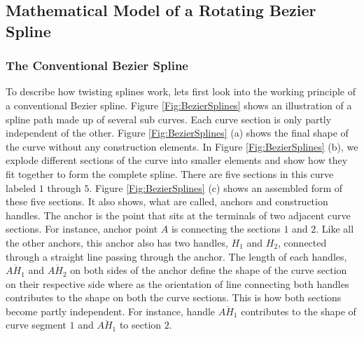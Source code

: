     \subsection{Mathematical Model of a Rotating Bezier Spline}
    \subsubsection{The Conventional Bezier Spline}
        To describe how twisting splines work, lets first look into the working principle of a conventional Bezier spline. Figure \ref{Fig:BezierSplines} shows an illustration of a spline path made up of several sub curves. Each curve section is only partly independent of the other. Figure \ref{Fig:BezierSplines}  (a) shows the final shape of the curve without any construction elements. In Figure \ref{Fig:BezierSplines} (b), we explode different sections of the curve into smaller elements and show how they fit together to form the complete spline. There are five sections in this curve labeled $1$ through $5$. Figure \ref{Fig:BezierSplines} (c) shows an assembled form of these five sections. It also shows, what are called, anchors and construction handles. The anchor is the point that sits at the terminals of two adjacent curve sections. For instance, anchor point $A$  is connecting the sections $1$ and $2$. Like all the other anchors, this anchor also has two handles, $H_1$ and $H_2$, connected through a straight line passing through the anchor. The length of each handles, $\overline{AH_1}$  and $\overline{AH_2}$ on both sides of the anchor define the shape of the curve section on their respective side where as the orientation of line connecting both handles contributes to the shape on both the curve sections. This is how both sections become partly independent. For instance, handle $\overline{AH_1}$ contributes to the shape of curve segment $1$ and $\overline{AH_1}$ to section $2$.


